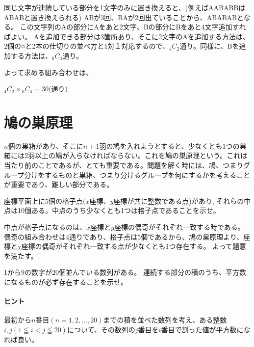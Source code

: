 \documentclass[uplatex,dvipdfmx]{jsbook}
\begin{document}
\begin{answer}
    同じ文字が連続している部分を1文字のみに置き換えると、(例えばAABABBはABABと置き換えられる)
    ABが3回、BAが2回出ていることから、ABABABとなる。
    この文字列のAの部分にAをあと2文字、Bの部分にBをあと4文字追加すればよい。
    Aを追加できる部分は3箇所あり、そこに2文字のAを追加する方法は、2個の○と2本の仕切りの並べ方と1対１対応するので、${}_4{C}_2$通り。同様に、Bを追加する方法は、${}_6{C}_4$通り。

    よって求める組み合わせは、

    ${}_4{C}_2 \times {}_6{C}_4=30$(通り)
\end{answer}

\section{鳩の巣原理}
$n$個の巣箱があり、そこに$n+1$羽の鳩を入れようとすると、少なくとも1つの巣箱には2羽以上の鳩が入らなければならない。これを鳩の巣原理という。これは当たり前のことであるが、とても重要である。問題を解く時には、鳩、つまりグループ分けをするものと巣箱、つまり分けるグループを何にするかを考えることが重要であり、難しい部分である。

\begin{problem}[練習問題1]
    座標平面上に5個の格子点($x$座標、$y$座標が共に整数である点)があり,
    それらの中点は10個ある。中点のうち少なくとも1つは格子点であることを示せ。
\end{problem}

\begin{answer}
    中点が格子点になるのは、$x$座標と$y$座標の偶奇がそれぞれ一致する時である。
    偶奇の組み合わせは4通りであり、格子点は5個であるから、鳩の巣原理より、座標とy座標の偶奇がそれぞれ一致する点が少なくとも1つ存在する。
    よって題意を満たす。
\end{answer}

\begin{problem}[練習問題2]
    1から9の数字が20個並んでいる数列がある。
    連続する部分の積のうち、平方数になるものが必ず存在することを示せ。
\end{problem}

\paragraph{ヒント}最初から$n$番目$(n=1,2,\dots,20)$までの積を並べた数列を考え、ある整数$i,j( 1 \leqq i < j \leqq 20 )$について、その数列の$j$番目を$i$番目で割った値が平方数になれば良い。
\end{document}
